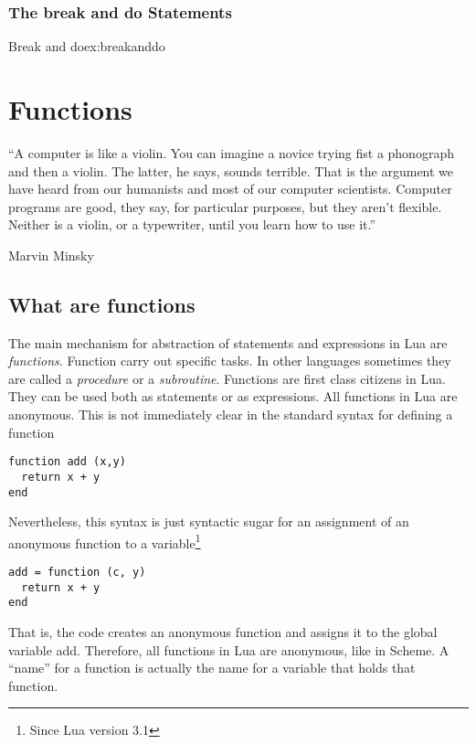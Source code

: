 \subsection{The break and do Statements}
\begin{texexample}{Break and do}{ex:breakanddo}
\end{texexample}

\chapter{Functions}

\epigraph{“A computer is like a violin. You can imagine a novice trying fist a phonograph and then a violin. The latter, he says, sounds terrible. That is the argument we have heard from our humanists and most of our computer scientists. Computer programs are good, they say, for particular purposes, but they aren't flexible. Neither is a violin, or a typewriter, until you learn how to use it.” }{Marvin Minsky}


\section{What are functions}

The main mechanism for abstraction of statements and expressions in Lua are \textit{functions}. Function carry out specific tasks. In other languages sometimes they are called a \textit{procedure} or a \textit{subroutine}. Functions are first class citizens in Lua. They can be used both as statements or as expressions. All functions in Lua are anonymous. This is not immediately clear in the standard syntax for defining a function
\begin{verbatim}
function add (x,y)
  return x + y
end  
\end{verbatim}
Nevertheless, this syntax is just syntactic sugar for an assignment of an anonymous function to a variable\footnote{Since Lua version 3.1}
\begin{verbatim}
add = function (c, y)
  return x + y
end  
\end{verbatim}
That is, the code creates an anonymous function and assigns it to the global
variable add. Therefore, all functions in Lua are anonymous, like in Scheme.
A \enquote{name} for a function is actually the name for a variable that holds that
function.

